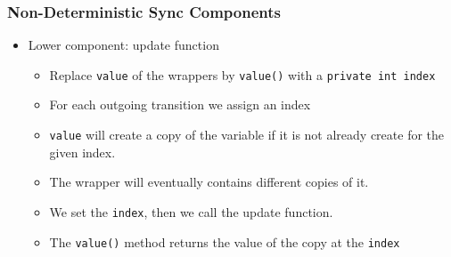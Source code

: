 \documentclass[compress,xcolor=dvipsnames,10pt]{beamer}
\begin{document}

\begin{frame}
 \frametitle{Non-Deterministic Sync Components}
 \begin{itemize}
  \item Lower component: update function

\begin{itemize}
 \item Replace \texttt{value} of the wrappers by \texttt{value()} with a \texttt{private int index}
\item For each outgoing transition we assign an index
\item \texttt{value} will create a copy of the variable if it is not already create for the given index. 
\item The wrapper will eventually contains different copies of it. 
\item We set the \texttt{index}, then we call the update function. 
\item The \texttt{value()} method returns the value of the copy at the \texttt{index}
\end{itemize}
\end{itemize}

\end{frame}
\end{document}
